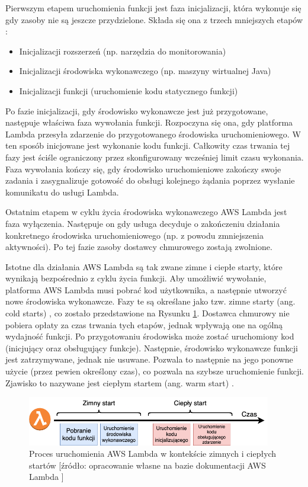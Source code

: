 Pierwszym etapem uruchomienia funkcji jest faza inicjalizacji, która wykonuje się gdy zasoby nie są jeszcze przydzielone.
Składa się ona z trzech mniejszych etapów \cite{awsLambdaDocs}: 
\begin{itemize}
    \item Inicjalizacji rozszerzeń (np. narzędzia do monitorowania)
    \item Inicjalizacji środowiska wykonawczego (np. maszyny wirtualnej Java)
    \item Inicjalizacji funkcji (uruchomienie kodu statycznego funkcji)
\end{itemize}

Po fazie inicjalizacji, gdy środowisko wykonawcze jest już przygotowane, następuje właściwa faza wywołania funkcji.
Rozpoczyna się ona, gdy platforma Lambda przesyła zdarzenie do przygotowanego środowiska uruchomieniowego.
W ten sposób inicjowane jest wykonanie kodu funkcji. 
Całkowity czas trwania tej fazy jest ściśle ograniczony przez skonfigurowany wcześniej limit czasu wykonania. 
Faza wywołania kończy się, gdy środowisko uruchomieniowe zakończy swoje zadania i zasygnalizuje gotowość do obsługi kolejnego żądania poprzez wysłanie komunikatu do usługi Lambda.

Ostatnim etapem w cyklu życia środowiska wykonawczego AWS Lambda jest faza wyłączenia.
Następuje on gdy usługa decyduje o zakończeniu działania konkretnego środowiska uruchomieniowego (np. z powodu zmniejszenia aktywności).
Po tej fazie zasoby dostawcy chmurowego zostają zwolnione.

Istotne dla działania AWS Lambda są tak zwane zimne i ciepłe starty, które wynikają bezpośrednio z cyklu życia funkcji.
Aby umożliwić wywołanie, platforma AWS Lambda musi pobrać kod użytkownika, a następnie utworzyć nowe środowiska wykonawcze.
Fazy te są określane jako tzw. zimne starty (ang. cold starts) \cite{awsLambdaDocs}, co zostało przedstawione na Rysunku \ref{fig:aws_lambda_warm_cold_starts}.
Dostawca chmurowy nie pobiera opłaty za czas trwania tych etapów, jednak wpływają one na ogólną wydajność funkcji.
Po przygotowaniu środowiska może zostać uruchomiony kod (inicjujący oraz obsługujący funkcje).
Następnie, środowisko wykonawcze funkcji jest zatrzymywane, jednak nie usuwane.
Pozwala to następnie na jego ponowne użycie (przez pewien określony czas), co pozwala na szybsze uruchomienie funkcji.
Zjawisko to nazywane jest ciepłym startem (ang. warm start) \cite{awsLambdaDocs}.

\begin{figure}[h]
    \centering
    \includegraphics[width=0.95\textwidth]{charts/warm_cold_starts_lambda.png}
    \caption{Proces uruchomienia AWS Lambda w kontekście zimnych i ciepłych startów [źródło: opracowanie własne na bazie dokumentacji AWS Lambda \cite{awsLambdaDocs}]}
    \label{fig:aws_lambda_warm_cold_starts}    
\end{figure}
